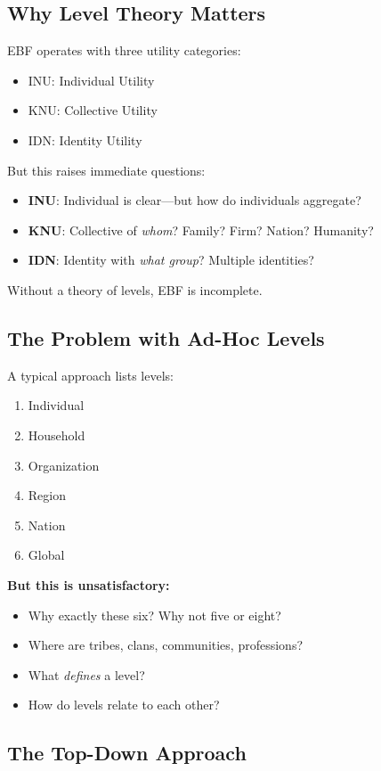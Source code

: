 \subsection{Why Level Theory Matters}

EBF operates with three utility categories:
\begin{itemize}
\item INU: Individual Utility
\item KNU: Collective Utility  
\item IDN: Identity Utility
\end{itemize}

But this raises immediate questions:
\begin{itemize}
\item \textbf{INU}: Individual is clear---but how do individuals aggregate?
\item \textbf{KNU}: Collective of \emph{whom}? Family? Firm? Nation? Humanity?
\item \textbf{IDN}: Identity with \emph{what group}? Multiple identities?
\end{itemize}

Without a theory of levels, EBF is incomplete.

\subsection{The Problem with Ad-Hoc Levels}

A typical approach lists levels:
\begin{enumerate}
\item Individual
\item Household
\item Organization
\item Region
\item Nation
\item Global
\end{enumerate}

\textbf{But this is unsatisfactory:}
\begin{itemize}
\item Why exactly these six? Why not five or eight?
\item Where are tribes, clans, communities, professions?
\item What \emph{defines} a level?
\item How do levels relate to each other?
\end{itemize}

\subsection{The Top-Down Approach}

